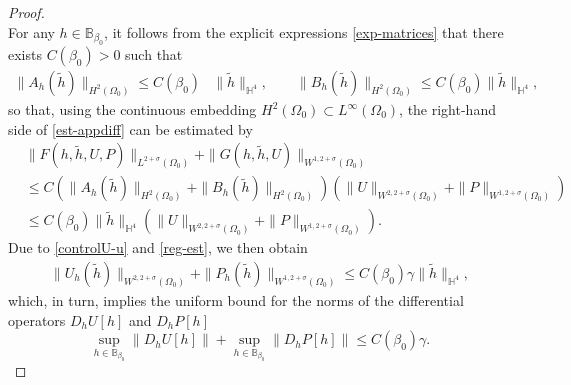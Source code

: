 \documentclass[11pt,a4paper]{amsart}
\theoremstyle{remark}
\theoremstyle{definition}
\numberwithin{equation}{section}
\numberwithin{proposition}{section}
\begin{document}
\begin{proof}
\begin{equation}
\end{equation}
For any $h\in \mathbb{B}_{\beta_0}$, it follows from the explicit expressions \eqref{exp-matrices} that there exists $C(\beta_0)>0$ such that
\begin{equation*}\begin{aligned}
    \|A_h(\tilde{h})\|_{H^2(\Omega_0)}\leq C(\beta_0)&\|\tilde{h}\|_{\mathbb{H}^4}, \qquad   \|B_h(\tilde{h})\|_{H^2(\Omega_0)}\leq C(\beta_0)\|\tilde{h}\|_{\mathbb{H}^4},
    \end{aligned}
\end{equation*} so that, using the continuous embedding $H^2(\Omega_0)\subset L^\infty(\Omega_0)$, the right-hand side of \eqref{est-appdiff} can be estimated by
\begin{equation}\label{est-sources-dif}
    \begin{aligned}
        &\|F(h, \tilde{h}, U, P)\|_{L^{2+\sigma} (\Omega_0)} + \|G(h, \tilde{h}, U)\|_{W^{1,2+\sigma} (\Omega_0)}\\[5pt]&\leq C\left(\|A_h(\tilde{h})\|_{H^2(\Omega_0)}+\|B_h(\tilde{h})\|_{H^2(\Omega_0)}\right)\left( \| U\|_{W^{2, 2+\sigma}(\Omega_0)} + \| P\|_{W^{1, 2+\sigma}(\Omega_0) } \right)
     \\[5pt]&  \leq  C(\beta_0)\|\tilde{h}\|_{\mathbb{H}^4}\left(\| U\|_{W^{2, 2+\sigma}(\Omega_0)} + \| P\|_{W^{1, 2+\sigma}(\Omega_0)} \right).
    \end{aligned}
\end{equation}
Due to \eqref{controlU-u} and \eqref{reg-est}, we then obtain
\begin{equation*}
    \begin{aligned}
    \|U_h(\tilde{h})\|_{W^{2, 2+\sigma}(\Omega_0)} + \|P_h(\tilde{h})\|_{W^{1, 2+\sigma}(\Omega_0)} \leq C(\beta_0)\gamma  \|\tilde{h}\|_{\mathbb{H}^4},
    \end{aligned}
\end{equation*}which, in turn, implies the uniform bound for the norms of the differential operators $D_hU[h]$ and $D_hP[h]$
\begin{equation}\label{uni-bou-diff}
    \sup_{h\in \mathbb{B}_{\beta_0}} \|D_hU[h]\| +  \sup_{h\in \mathbb{B}_{\beta_0}} \|D_hP[h]\| \leq C(\beta_0)\gamma.
\end{equation}


\end{proof}
\end{document}
